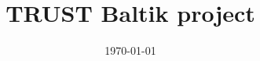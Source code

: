 \documentclass[10pt, hyperref={unicode=true,pdfusetitle, bookmarks=true,bookmarksnumbered=false,bookmarksopen=false, breaklinks=false,pdfborder={0 0 1},backref=true,colorlinks=true,linkcolor=darkblue,pageanchor, urlcolor=darkblue}]{beamer}
\title[TRUST Baltik project]{TRUST Baltik project}
\institute[CEA/DEN/DANS/DM2S/STMF] %
{
CEA Saclay \\ %
\medskip
\textit{triou@cea.fr} %
}
\date{\today} %
\begin{document}
\begin{frame}
\titlepage %
\end{frame}

\begin{frame}
\tableofcontents [hideallsubsections]
\end{frame}
\end{document}
